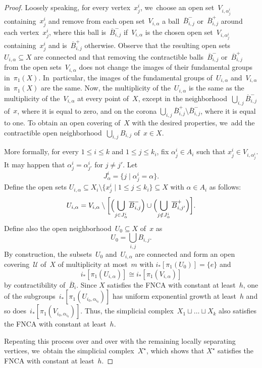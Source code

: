 \documentclass[11pt]{article}
\providecommand{\widebar}[1]{\overline{#1}}
\theoremstyle{definition}
\numberwithin{equation}{section}
\begin{document}
\begin{proof}
Loosely speaking, for every vertex~$x_j^i$, we~choose an open set~$V_{i,\alpha^i_j}$ containing~$x_j^i$ and remove from each open set~$V_{i,\alpha}$ a ball~$\widebar{B}^-_{i,j}$ or~$\widebar{B}^+_{i,j}$ around each vertex~$x_j^i$, where this ball is~$\widebar{B}^-_{i,j}$ if~$V_{i,\alpha}$ is the chosen open set~$V_{i,\alpha_j^i}$ containing~$x_j^i$ and is~$\widebar{B}^+_{i,j}$ otherwise.
Observe that the resulting open sets~$U_{i,\alpha} \subseteq X$ are connected and that removing the contractible balls~$\widebar{B}^-_{i,j}$ or~$\widebar{B}^+_{i,j}$ from the open sets~$V_{i,\alpha}$ does not change the images of their fundamental groups in~$\pi_1(X)$. In~particular, the images of the fundamental groups of~$U_{i,\alpha}$ and~$V_{i,\alpha}$ in~$\pi_1(X)$ are the same.
Now, the multiplicity of the~$U_{i,\alpha}$ is the same as the multiplicity of the~$V_{i,\alpha}$ at every point of~$X$, except in the neighborhood~$\bigcup_{i,j} \widebar{B}^-_{i,j}$ of~$x$, where it is equal to zero, and on the corona $\bigcup_{i,j} \widebar{B}^+_{i,j} \setminus \widebar{B}^-_{i,j}$, where it is equal to one.
To obtain an open covering of~$X$ with the desired properties, we~add the contractible open neighborhood~$\bigcup_{i,j} B_{i,j}$ of~$x \in X$.

More formally, for every $1 \leq i \leq k$ and $1 \leq j \leq k_i$, fix $\alpha_j^i \in A_i$ such that $x_j^i \in V_{i,\alpha_j^i}$.
It may happen that $\alpha_j^i=\alpha_{j'}^i$ for $j \neq j'$.
Let
\[
J_\alpha^i = \{j \mid \alpha_j^i = \alpha\}.
\]
Define the open sets $U_{i,\alpha} \subseteq X_i \setminus \{x_j^i \mid 1 \leq j \leq k_i\} \subseteq X$ with $\alpha \in A_i$ as follows:
\[
U_{i,\alpha} = V_{i,\alpha} \setminus \biggl[ \Bigl(\bigcup_{j \in J_\alpha^i} \widebar{B}^-_{i,j} \Bigr) \cup \Bigl(\bigcup_{j \notin J_\alpha^i} \widebar{B}^+_{i,j'} \Bigr) \biggr].
\]
Define also the open neighborhood~$U_0 \subseteq X$ of~$x$ as
\[
U_0 = \bigcup_{i,j} B_{i,j}.
\]
By construction, the subsets~$U_0$ and~$U_{i,\alpha}$ are connected and form an open covering~$\mathcal{U}$ of~$X$ of multiplicity at most~$m$ with $i_*[\pi_1(U_0)] = \{e\}$ and
\[
i_*[\pi_1(U_{i,\alpha})] \cong i_*[\pi_1(V_{i,\alpha})]
\]
by contractibility of~$\widebar{B}_i$.
Since $X$ satisfies the FNCA with constant at least~$h$, one of the subgroups~$i_*[\pi_1(U_{i_0,\alpha_{i_0}})]$ has uniform exponential growth at least~$h$ and so does~$ i_*[\pi_1(V_{i_0,\alpha_{i_0}})]$.
Thus, the simplicial complex~$X_1 \sqcup \dots \sqcup X_k$ also satisfies the FNCA with constant at least~$h$.

Repeating this process over and over with the remaining locally separating vertices, we~obtain the simplicial complex~$X^\star$, which shows that $X^\star$ satisfies the FNCA with constant at least~$h$.
\end{proof}
\end{document}
